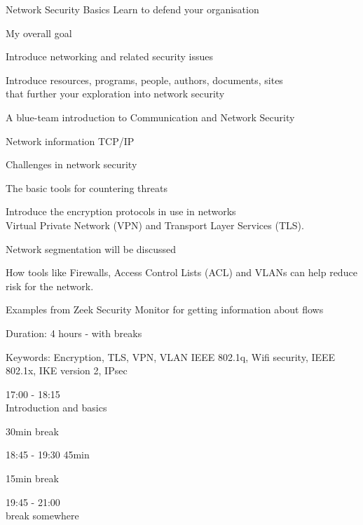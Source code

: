 \documentclass[Screen16to9,17pt]{foils}
\begin{document}
\mytitlepage
{Network Security Basics}
{Learn to defend your organisation}

\hlkprofiluk



My overall goal

\begin{list2}
\item Introduce networking and related security issues
\item Introduce resources, programs, people, authors, documents, sites\\
 that further your exploration into network security
\end{list2}


A blue-team introduction to Communication and Network Security
\begin{list2}
\item Network information TCP/IP
\item Challenges in network security
\item The basic tools for countering threats
\item Introduce the encryption protocols in use in networks\\
Virtual Private Network (VPN) and Transport Layer Services (TLS).
\item Network segmentation will be discussed
\item How tools like Firewalls, Access Control Lists (ACL) and VLANs can help reduce risk for the network.
\item Examples from Zeek Security Monitor for getting information about flows
\end{list2}

Duration: 4 hours - with breaks

Keywords: Encryption, TLS, VPN, VLAN IEEE 802.1q, Wifi security, IEEE
802.1x, IKE version 2, IPsec




\begin{list2}
\item 17:00 - 18:15\\
Introduction and basics
\item 30min break\\

\item 18:45 - 19:30 45min\\

\item 15min break\\

\item 19:45 - 21:00\\
break somewhere
\end{list2}
\end{document}
